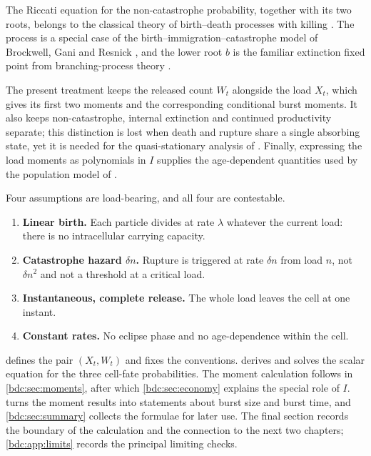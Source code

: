 \begin{remark}
\label{bdc:rem:novelty}
The Riccati equation for the non-catastrophe probability, together with its two
roots, belongs to the classical theory of birth--death processes with killing
\cite{karlin1982linear}. The process is a special case of the
birth--immigration--catastrophe model of Brockwell, Gani and Resnick
\cite{brockwell1982birth}, and the lower root $b$ is the familiar extinction
fixed point from branching-process theory \cite{Athreya1972,Harris1963}.

The present treatment keeps the released count $W_t$ alongside the load $X_t$,
which gives its first two moments and the corresponding conditional burst
moments. It also keeps non-catastrophe, internal extinction and continued
productivity separate; this distinction is lost when death and rupture share a
single absorbing state, yet it is needed for the quasi-stationary analysis of
. Finally, expressing the load moments as polynomials
in $I$ supplies the age-dependent quantities used by the population model of
.
\end{remark}

Four assumptions are load-bearing, and all four are contestable.
\begin{enumerate}[leftmargin=1.8em,itemsep=0.2em,topsep=0.3em]
\item \textbf{Linear birth.} Each particle divides at rate $\lambda$ whatever
the current load: there is no intracellular carrying capacity.
\item \textbf{Catastrophe hazard $\delta n$.} Rupture is triggered at rate
$\delta n$ from load $n$, not $\delta n^2$ and not a threshold at a critical
load.
\item \textbf{Instantaneous, complete release.} The whole load leaves the cell
at one instant.
\item \textbf{Constant rates.} No eclipse phase and no age-dependence within
the cell.
\end{enumerate}

 defines the pair $(X_t,W_t)$ and fixes the conventions.
 derives and solves the scalar equation for the three
cell-fate probabilities. The moment calculation follows in
\cref{bdc:sec:moments}, after which \cref{bdc:sec:economy} explains the special
role of $I$.  turns the moment results into statements about
burst size and burst time, and \cref{bdc:sec:summary} collects the formulae for
later use. The final section records the boundary of the calculation and the
connection to the next two chapters; \cref{bdc:app:limits} records the
principal limiting checks.

\FloatBarrier
